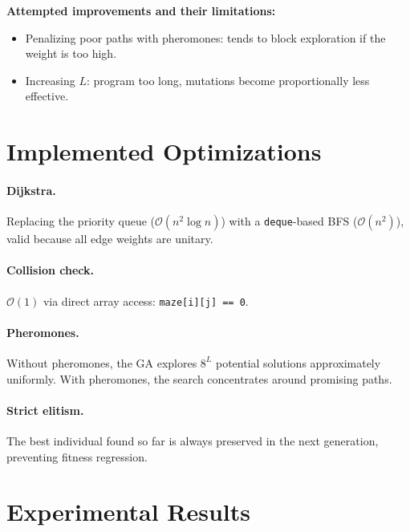 \documentclass[12pt, a4paper]{article}
\theoremstyle{definition}
\newcommand{\bigO}[1]{\mathcal{O}\!\left(#1\right)}
\newcommand{\code}[1]{\texttt{#1}}
\begin{document}
\textbf{Attempted improvements and their limitations:}
\begin{itemize}[noitemsep]
    \item Penalizing poor paths with pheromones: tends to block exploration if the
          weight is too high.
    \item Increasing $L$: program too long, mutations become proportionally
          less effective.
\end{itemize}

\section{Implemented Optimizations}

\paragraph{Dijkstra.}
Replacing the priority queue ($\bigO{n^2 \log n}$) with a \code{deque}-based BFS
($\bigO{n^2}$), valid because all edge weights are unitary.

\paragraph{Collision check.}
$\bigO{1}$ via direct array access: \code{maze[i][j] == 0}.

\paragraph{Pheromones.}
Without pheromones, the GA explores $8^L$ potential solutions approximately
uniformly. With pheromones, the search concentrates around promising paths.

\paragraph{Strict elitism.}
The best individual found so far is always preserved in the next generation,
preventing fitness regression.

\section{Experimental Results}
\end{document}
